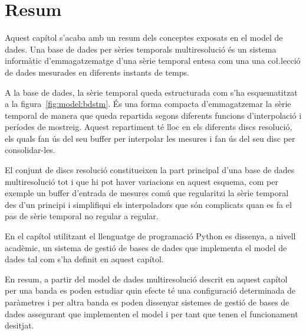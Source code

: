 \section{Resum}

Aquest capítol s'acaba amb un resum dels conceptes exposats en el
model de dades. Una base de dades per sèries temporals multiresolució
és un sistema informàtic d'emmagatzematge d'una sèrie temporal entesa
com una una co\l.lecció de dades mesurades en diferents instants de
temps.

A la base de dades, la sèrie temporal queda estructurada com s'ha esquematitzat a  la figura~\ref{fig:model:bdstm}. És una forma compacta d'emmagatzemar la sèrie temporal de manera que queda repartida segons diferents funcions d'interpolació i períodes de mostreig. Aquest repartiment té lloc en els diferents discs resolució, els quals fan ús del seu buffer per interpolar les mesures i fan ús del seu disc per consolidar-les. 

El conjunt de discs resolució constitueixen la part principal d'una base de dades multiresolució tot i que hi pot haver variacions en aquest esquema, com per exemple un buffer d'entrada de mesures comú que regularitzi la sèrie temporal des d'un principi i simplifiqui els interpoladors que són complicats quan es fa el pas de sèrie temporal no regular a regular.


En el capítol 
 utilitzant el llenguatge de programació Python es dissenya, a nivell acadèmic, un sistema de gestió de bases de dades que implementa el model de dades tal com s'ha definit en aquest capítol.


En resum, a partir del model de dades multiresolució descrit en aquest capítol per una banda es poden estudiar quin efecte té una configuració determinada de paràmetres i per altra banda es poden dissenyar sistemes de gestió de bases de dades assegurant que implementen el model i per tant que tenen el funcionament desitjat.






